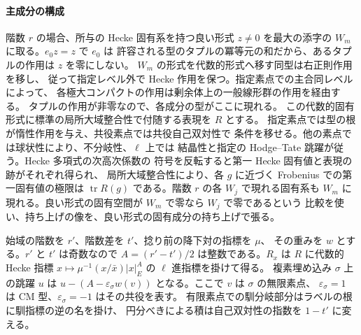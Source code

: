 \paragraph{主成分の構成}
階数 \(r\) の場合、所与の Hecke 固有系を持つ良い形式
\(z\ne0\) を最大の添字の \(W_m\) に取る。\(e_0z=z\) で \(e_0\) は
許容される型のタプルの冪等元の和だから、あるタプルの作用は \(z\) を零にしない。
\(W_m\) の形式を代数的形式へ移す同型は右正則作用を移し、
従って指定レベル外で Hecke 作用を保つ。指定素点での主合同レベルによって、
各極大コンパクトの作用は剰余体上の一般線形群の作用を経由する。
タプルの作用が非零なので、各成分の型がここに現れる。
この代数的固有形式に標準の局所大域整合性で付随する表現を \(R\) とする。
指定素点では型の根が惰性作用を与え、共役素点では共役自己双対性で
条件を移せる。他の素点では球状性により、不分岐性、\(\ell\) 上では
結晶性と指定の Hodge--Tate 跳躍が従う。Hecke 多項式の次高次係数の
符号を反転すると第一 Hecke 固有値と表現の跡がそれぞれ得られ、
局所大域整合性により、各 \(g\) に近づく Frobenius での第一固有値の極限は
\(\operatorname{tr}R(g)\) である。階数 \(r\) の各 \(W_j\) で現れる固有系も
\(W_m\) に現れる。良い形式の固有空間が \(W_m\) で零なら \(W_j\) で零であるという
比較を使い、持ち上げの像を、良い形式の固有成分の持ち上げで張る。

始域の階数を \(r'\)、階数差を \(t'\)、捻り前の降下対の指標を \(\mu\)、
その重みを \(w\) とする。\(r'\) と \(t'\) は奇数なので
\(A=(r'-t')/2\) は整数である。\(R_x\) は \(R\) に代数的 Hecke 指標
\(x\mapsto\mu^{-1}(x/\bar x)|x|_E^A\) の \(\ell\) 進指標を掛けて得る。
複素埋め込み \(\sigma\) 上の跳躍 \(u\) は
\(u-(A-\varepsilon_\sigma w(v))\) となる。ここで \(v\) は \(\sigma\) の無限素点、
\(\varepsilon_\sigma=1\) は CM 型、\(\varepsilon_\sigma=-1\) はその共役を表す。
有限素点での馴分岐部分はラベルの根に馴指標の逆の名を掛け、
円分べきによる積は自己双対性の指数を \(1-t'\) に変える。

